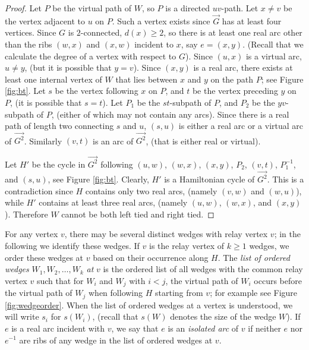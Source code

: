 \documentclass[12pt,letterpaper,oneside]{book}
\begin{document}
\begin{proof}
Let $P$ be the virtual path of $W$, so $P$ is a directed $uv$-path.  Let $x\ne v$ be the vertex adjacent to 
$u$ on $P$.  Such a vertex exists since $\vec{G}$ has at least four vertices.  
Since $G$ is $2$-connected, $d(x) \ge 2$, so there is at least one real arc other than the ribs $(w,x)$ and $(x,w)$ incident to $x$, 
say $e=(x,y)$.  (Recall that we calculate the degree of a vertex with respect to $G$).  Since $(u,x)$ is a virtual arc, $u\ne y$, 
(but it is possible that $y=v$).  Since $(x,y)$ is a real arc, there exists at least 
one internal vertex of $W$ that lies between $x$ and $y$ on the path $P$; see Figure \ref{fig:bt}.  Let $s$ be the vertex 
following $x$ on $P$, and 
$t$ be the vertex preceding $y$ on $P$, (it is possible that $s=t$).  Let $P_1$ be the $st$-subpath of $P$, and $P_2$ be 
the $yv$-subpath of $P$, (either of which may not contain any arcs).  Since there is a real path of length two connecting $s$ and $u$, 
$(s,u)$ is either a real arc or a virtual arc of $\vec{G^2}$.  Similarly $(v,t)$ is an 
arc of $\vec{G^2}$, (that is either real or virtual).  

Let $H'$ be the cycle in $\vec{G^2}$ following 
$(u,w)$, $(w,x)$, $(x,y)$, $P_2$, $(v,t)$, $P_1^{-1}$, and $(s,u)$, see Figure \ref{fig:bt}.  
Clearly, $H'$ is a Hamiltonian cycle of $\vec{G^2}$.  
This is a contradiction since $H$ contains only two real arcs, (namely $(v,w)$ and $(w,u)$), while 
$H'$ contains at least three real arcs, (namely $(u,w)$, $(w,x)$, and $(x,y)$).  Therefore $W$ cannot be both left tied and right tied.
\end{proof}


For any vertex $v$, there may be several distinct wedges with relay vertex $v$; in the following we identify these wedges.  
If $v$ is the relay vertex of $k\ge 1$ wedges, we order these wedges at $v$ based on their occurrence along $H$.  
The \emph{list of ordered wedges} $W_1,W_2,\ldots,W_k$ \emph{at} $v$  
is the ordered list of all wedges with the common relay vertex $v$ such that for $W_i$ and $W_j$ with $i<j$, the virtual path of $W_i$  
occurs before the virtual path of $W_j$ when following $H$ starting from $v$; for example see Figure \ref{fig:wedgeorder}.  
When the list of ordered 
wedges at a vertex is understood, we will write $s_i$ for $s(W_i)$, (recall that $s(W)$ denotes the size of the wedge $W$).   
If $e$ is a  
real arc incident with $v$, we say that $e$ is an \emph{isolated arc} of $v$ if neither $e$ nor $e^{-1}$ are ribs of any wedge 
in the list of ordered wedges at $v$.
\end{document}
